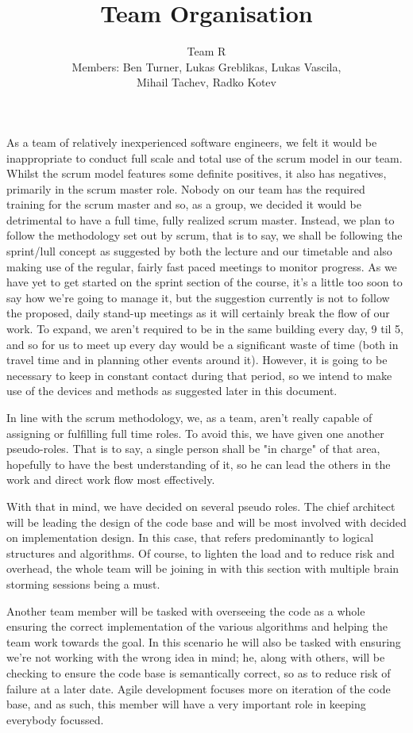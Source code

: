 \documentclass[11pt]{article}
\title{Team Organisation}
\date{Team R\\Members: Ben Turner, Lukas Greblikas, Lukas Vascila,\\
Mihail Tachev, Radko Kotev}
\begin{document}
\maketitle


As a team of relatively inexperienced software engineers, we felt it
would be inappropriate to conduct full scale and total use of the
scrum model in our team. Whilst the scrum model features some
definite positives, it also has negatives, primarily in the scrum
master role. Nobody on our team has the required training for the
scrum master and so, as a group, we decided it would be detrimental
to have a full time, fully realized scrum master. Instead, we plan
to follow the methodology set out by scrum, that is to say, we shall
be following the sprint/lull concept as suggested by both the
lecture and our timetable and also making use of the regular, fairly
fast paced meetings to monitor progress. As we have yet to get
started on the sprint section of the course, it's a little too soon
to say how we're going to manage it, but the suggestion currently is
not to follow the proposed, daily stand-up meetings as it will
certainly break the flow of our work. To expand, we aren't required
to be in the same building every day, 9 til 5, and so for us to meet
up every day would be a significant waste of time (both in travel
time and in planning other events around it). However, it is going
to be necessary to keep in constant contact during that period, so
we intend to make use of the devices and methods as suggested later
in this document.

In line with the scrum methodology, we, as a team, aren't really
capable of assigning or fulfilling full time roles. To avoid this,
we have given one another pseudo-roles. That is to say, a single
person shall be "in charge" of that area, hopefully to have the best
understanding of it, so he can lead the others in the work and
direct work flow most effectively.

With that in mind, we have decided on several pseudo roles. The
chief architect will be leading the design of the code base and will
be most involved with decided on implementation design. In this
case, that refers predominantly to logical structures and
algorithms. Of course, to lighten the load and to reduce risk and
overhead, the whole team will be joining in with this section with
multiple brain storming sessions being a must.

Another team member will be tasked with overseeing the code as a
whole ensuring the correct implementation of the various algorithms
and helping the team work towards the goal. In this scenario he will
also be tasked with ensuring we're not working with the wrong idea
in mind; he, along with others, will be checking to ensure the code
base is semantically correct, so as to reduce risk of failure at a
later date. Agile development focuses more on iteration of the code
base, and as such, this member will have a very important role in
keeping everybody focussed.
\end{document}
